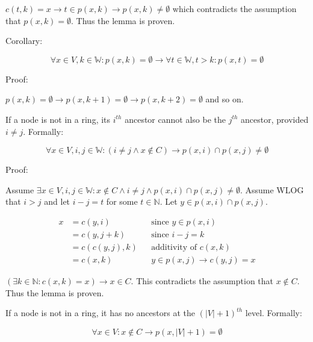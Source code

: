 \documentclass[11pt]{article}
\begin{document}
    $c(t,k) = x \rightarrow t \in p(x,k) \rightarrow p(x,k) \not = \emptyset$ which contradicts the assumption that $p(x,k) = \emptyset$. Thus the lemma is proven.

    Corollary:

    \begin{equation}
        \forall x \in V,k \in \mathbb{W}: p(x,k) = \emptyset \rightarrow \forall t \in \mathbb{W}, t>k: p(x,t) = \emptyset
        \label{no_parents_k_allk}
    \end{equation}

    Proof:

    $p(x,k) = \emptyset \rightarrow p(x,k+1) = \emptyset \rightarrow p(x,k+2) = \emptyset$ and so on.

    If a node is not in a ring, its $i^{th}$ ancestor cannot also be the $j^{th}$ ancestor, provided $i\not = j$. Formally:

    \begin{equation}
        \forall x \in V, i,j \in \mathbb{W}: (i \not = j \land x \not \in C) \rightarrow p(x,i) \cap p(x,j) \not = \emptyset
        \label{disjoint_ancestors}
    \end{equation}

    Proof:

    Assume $\exists x \in V, i,j \in \mathbb{W}: x \not \in C \land i\not = j\land p(x,i) \cap p(x,j) \not = \emptyset$. Assume WLOG that $i>j$ and let $i-j=t$ for some $t \in \mathbb{N}$. Let $y \in p(x,i) \cap p(x,j)$.

    \begin{align*}
        \text{$x$} &= \text{$c(y,i)$} && \text{since $y \in p(x,i)$} \\
        &= \text{$c(y,j+k)$} && \text{since $i-j=k$} \\
        &= \text{$c(c(y,j),k)$} && \text{additivity of $c(x,k)$} \\
        &= \text{$c(x,k)$} && \text{$y \in p(x,j) \rightarrow c(y,j)=x$}
    \end{align*}

    $(\exists k\in \mathbb{N}: c(x,k)=x) \rightarrow x \in C$. This contradicts the assumption that $x \not \in C$. Thus the lemma is proven.



    If a node is not in a ring, it has no ancestors at the $(|V|+1)^{th}$ level. Formally:

    \begin{equation}
        \forall x \in V: x \not \in C \rightarrow p(x,|V|+1) = \emptyset
        \label{no_ancestors_V+1}
    \end{equation}
\end{document}
